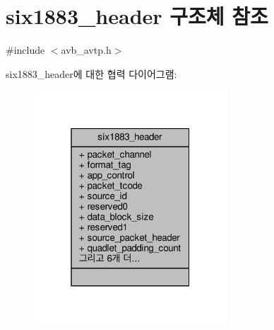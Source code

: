 \hypertarget{structsix1883__header}{}\section{six1883\+\_\+header 구조체 참조}
\label{structsix1883__header}


{\ttfamily \#include $<$avb\+\_\+avtp.\+h$>$}



six1883\+\_\+header에 대한 협력 다이어그램\+:
\nopagebreak
\begin{figure}[H]
\begin{center}
\leavevmode
\includegraphics[width=205pt]{structsix1883__header__coll__graph}
\end{center}
\end{figure}
